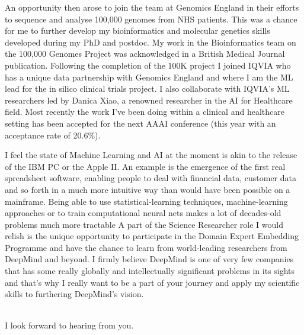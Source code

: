 \documentclass[11pt,a4paper,sans]{moderncv}        %
\begin{document}
%
An opportunity then arose to join the team at 
Genomics England in their efforts to sequence
and analyse 100,000 genomes from NHS patients.
%
This was a chance for me to further develop my
bioinformatics and molecular genetics skills developed
during my PhD and postdoc.
%
My work in the Bioinformatics team 
on the 100,000 Genomes Project was 
acknowledged in a British Medical Journal publication\cite{gel_bmj}.
%
Following the completion of the 100K project
I joined IQVIA who has a unique data partnership
with Genomics England and where I am the ML 
lead for the in silico clinical trials project.
%
I also collaborate with IQVIA's ML researchers
led by Danica Xiao, a renowned researcher in
the AI for Healthcare field.
%
Most recently the work I've been doing 
within a clinical and healthcare setting has 
been accepted for the next AAAI conference\cite{conan} 
(this year with an acceptance rate 
of 20.6\%).
%

%
I feel the state of Machine Learning and AI at the 
moment is akin to the release of the IBM PC or the Apple II.
%
An example is the emergence of the first real spreadsheet 
software, enabling people to deal with 
financial data, customer data and so forth in a much 
more intuitive way than would have been possible on a mainframe. 
%
Being able to use statistical-learning techniques, 
machine-learning approaches or to train 
computational neural nets 
makes a lot of decades-old problems much 
more tractable
%
A part of the Science Researcher role 
I would relish is the unique opportunity 
to participate in the Domain Expert Embedding Programme
and have the chance to learn from world-leading researchers from 
DeepMind and beyond.
%
I firmly believe DeepMind 
is one of very 
few companies that has some really globally and 
intellectually significant problems in its sights 
and that's why I really want to be a part of 
your journey and apply my scientific skills to furthering
DeepMind's vision.
% 

~\\
I look forward to hearing from you. 

~\\

\makeletterclosing

%

%
\renewcommand{\refname}{References}

\end{document}
